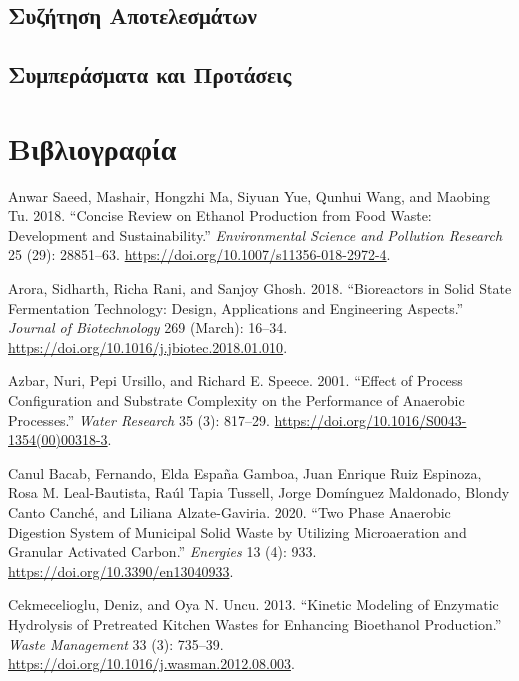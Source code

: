 \documentclass[11pt]{report}
\begin{document}
\chapter{Συζήτηση Αποτελεσμάτων}
\label{sec:orged4f9fd}
\label{sec:result_discussion}

\chapter{Συμπεράσματα και Προτάσεις}
\label{sec:org9f00360}
\label{sec:conclusion}

\part*{Βιβλιογραφία}
\label{sec:org38fb8c6}
\begin{hangparas}{1.5em}{1}
\hypertarget{citeproc_bib_item_1}{Anwar Saeed, Mashair, Hongzhi Ma, Siyuan Yue, Qunhui Wang, and Maobing Tu. 2018. “Concise Review on Ethanol Production from Food Waste: Development and Sustainability.” \textit{Environmental Science and Pollution Research} 25 (29): 28851–63. \url{https://doi.org/10.1007/s11356-018-2972-4}.}

\hypertarget{citeproc_bib_item_2}{Arora, Sidharth, Richa Rani, and Sanjoy Ghosh. 2018. “Bioreactors in Solid State Fermentation Technology: Design, Applications and Engineering Aspects.” \textit{Journal of Biotechnology} 269 (March): 16–34. \url{https://doi.org/10.1016/j.jbiotec.2018.01.010}.}

\hypertarget{citeproc_bib_item_3}{Azbar, Nuri, Pepi Ursillo, and Richard E. Speece. 2001. “Effect of Process Configuration and Substrate Complexity on the Performance of Anaerobic Processes.” \textit{Water Research} 35 (3): 817–29. \url{https://doi.org/10.1016/S0043-1354(00)00318-3}.}

\hypertarget{citeproc_bib_item_4}{Canul Bacab, Fernando, Elda España Gamboa, Juan Enrique Ruiz Espinoza, Rosa M. Leal-Bautista, Raúl Tapia Tussell, Jorge Domínguez Maldonado, Blondy Canto Canché, and Liliana Alzate-Gaviria. 2020. “Two Phase Anaerobic Digestion System of Municipal Solid Waste by Utilizing Microaeration and Granular Activated Carbon.” \textit{Energies} 13 (4): 933. \url{https://doi.org/10.3390/en13040933}.}

\hypertarget{citeproc_bib_item_5}{Cekmecelioglu, Deniz, and Oya N. Uncu. 2013. “Kinetic Modeling of Enzymatic Hydrolysis of Pretreated Kitchen Wastes for Enhancing Bioethanol Production.” \textit{Waste Management} 33 (3): 735–39. \url{https://doi.org/10.1016/j.wasman.2012.08.003}.}


\end{hangparas}
\end{document}
